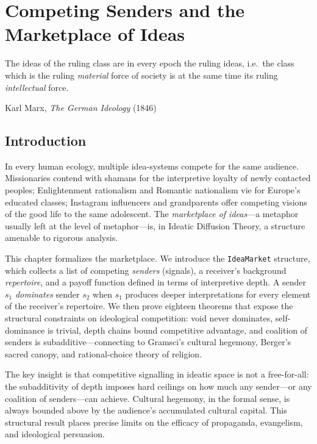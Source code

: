 
\chapter{Competing Senders and the Marketplace of Ideas}
\label{ch:marketplace}

\epigraph{The ideas of the ruling class are in every epoch the ruling ideas,
i.e.\ the class which is the ruling \emph{material} force of society is at the
same time its ruling \emph{intellectual} force.}{Karl Marx, \textit{The German Ideology} (1846)}

\section{Introduction}

In every human ecology, multiple idea-systems compete for the same audience.
Missionaries contend with shamans for the interpretive loyalty of
newly contacted peoples; Enlightenment rationalism and Romantic nationalism
vie for Europe's educated classes; Instagram influencers and grandparents
offer competing visions of the good life to the same adolescent.
The \emph{marketplace of ideas}---a metaphor usually left at the level of
metaphor---is, in Ideatic Diffusion Theory, a structure amenable to rigorous
analysis.

This chapter formalizes the marketplace.  We introduce the \texttt{IdeaMarket}
structure, which collects a list of competing \emph{senders} (signals), a
receiver's background \emph{repertoire}, and a payoff function defined in
terms of interpretive depth.  A sender $s_1$ \emph{dominates} sender $s_2$
when $s_1$ produces deeper interpretations for every element of the
receiver's repertoire.  We then prove eighteen theorems that expose the
structural constraints on ideological competition: void never dominates,
self-dominance is trivial, depth chains bound competitive advantage, and
coalition of senders is subadditive---connecting to Gramsci's cultural
hegemony, Berger's sacred canopy, and rational-choice theory of religion.

The key insight is that competitive signalling in ideatic space is not a
free-for-all: the subadditivity of depth imposes hard ceilings on how much
any sender---or any coalition of senders---can achieve.  Cultural hegemony,
in the formal sense, is always bounded above by the audience's accumulated
cultural capital.  This structural result places precise limits on the
efficacy of propaganda, evangelism, and ideological persuasion.

